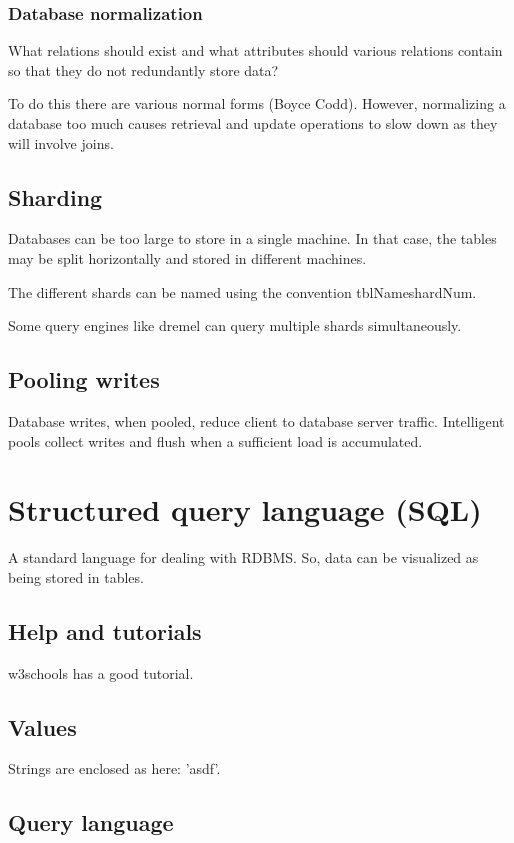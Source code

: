 \subsection{Database normalization}
What relations should exist and what attributes should various relations contain so that they do not redundantly store data?

To do this there are various normal forms (Boyce Codd). However, normalizing a database too much causes retrieval and update operations to slow down as they will involve joins.

\section{Sharding}
Databases can be too large to store in a single machine. In that case, the tables may be split horizontally and stored in different machines.

The different shards can be named using the convention tblName\@ shardNum.

Some query engines like dremel can query multiple shards simultaneously.

\section{Pooling writes}
Database writes, when pooled, reduce client to database server traffic. Intelligent pools collect writes and flush when a sufficient load is accumulated.

\chapter{Structured query language (SQL)}
A standard language for dealing with RDBMS. So, data can be visualized as being stored in tables.

\section{Help and tutorials}
w3schools has a good tutorial.

\section{Values}
Strings are enclosed as here: 'asdf'.

\section{Query language}

